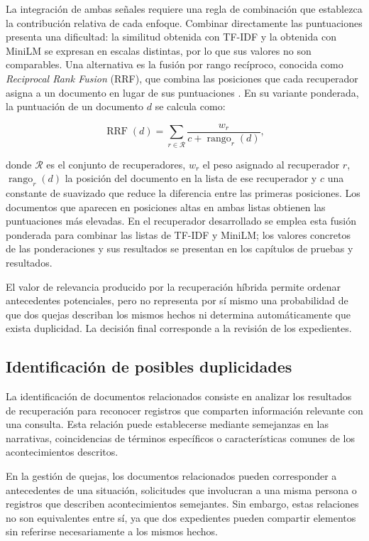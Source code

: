 La integración de ambas señales requiere una regla de combinación que establezca la contribución relativa de cada enfoque. Combinar directamente las puntuaciones presenta una dificultad: la similitud obtenida con TF-IDF y la obtenida con MiniLM se expresan en escalas distintas, por lo que sus valores no son comparables. Una alternativa es la fusión por rango recíproco, conocida como \textit{Reciprocal Rank Fusion} (RRF), que combina las posiciones que cada recuperador asigna a un documento en lugar de sus puntuaciones \cite{cormack2009rrf}. En su variante ponderada, la puntuación de un documento $d$ se calcula como:

\begin{equation}
    \operatorname{RRF}(d) = \sum_{r \in \mathcal{R}} \frac{w_r}{c + \operatorname{rango}_r(d)},
    \label{eq:rrf}
\end{equation}

donde $\mathcal{R}$ es el conjunto de recuperadores, $w_r$ el peso asignado al recuperador $r$, $\operatorname{rango}_r(d)$ la posición del documento en la lista de ese recuperador y $c$ una constante de suavizado que reduce la diferencia entre las primeras posiciones. Los documentos que aparecen en posiciones altas en ambas listas obtienen las puntuaciones más elevadas. En el recuperador desarrollado se emplea esta fusión ponderada para combinar las listas de TF-IDF y MiniLM; los valores concretos de las ponderaciones y sus resultados se presentan en los capítulos de pruebas y resultados.

El valor de relevancia producido por la recuperación híbrida permite ordenar antecedentes potenciales, pero no representa por sí mismo una probabilidad de que dos quejas describan los mismos hechos ni determina automáticamente que exista duplicidad. La decisión final corresponde a la revisión de los expedientes.

\subsection{Identificación de posibles duplicidades}

La identificación de documentos relacionados consiste en analizar los resultados de recuperación para reconocer registros que comparten información relevante con una consulta. Esta relación puede establecerse mediante semejanzas en las narrativas, coincidencias de términos específicos o características comunes de los acontecimientos descritos.

En la gestión de quejas, los documentos relacionados pueden corresponder a antecedentes de una situación, solicitudes que involucran a una misma persona o registros que describen acontecimientos semejantes. Sin embargo, estas relaciones no son equivalentes entre sí, ya que dos expedientes pueden compartir elementos sin referirse necesariamente a los mismos hechos.

